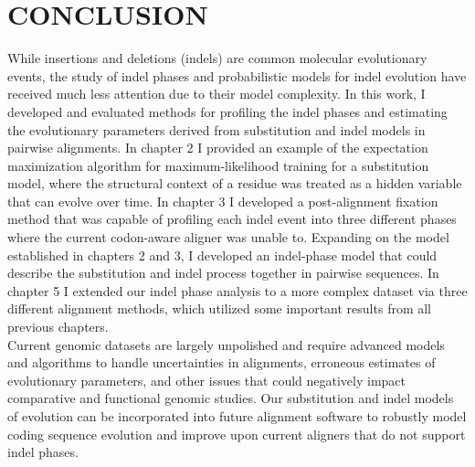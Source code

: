 \chapter{\normalfont CONCLUSION}
While insertions and deletions (indels) are common molecular evolutionary events, the study of indel phases and probabilistic models for indel evolution have received much less attention due to their model complexity. In this work, I developed and evaluated methods for profiling the indel phases and estimating the evolutionary parameters derived from substitution and indel models in pairwise alignments. In chapter 2 I provided an example of the expectation maximization algorithm for maximum-likelihood training for a substitution model, where the structural context of a residue was treated as a hidden variable that can evolve over time. In chapter 3 I developed a post-alignment fixation method that was capable of profiling each indel event into three different phases where the current codon-aware aligner was unable to. Expanding on the model established in chapters 2 and 3, I developed an indel-phase model that could describe the substitution and indel process together in pairwise sequences. In chapter 5 I extended our indel phase analysis to a more complex dataset via three different alignment methods, which utilized some important results from all previous chapters. \\
\indent Current genomic datasets are largely unpolished and require advanced models and algorithms to handle uncertainties in alignments, erroneous estimates of evolutionary parameters, and other issues that could negatively impact comparative and functional genomic studies. Our substitution and indel models of evolution can be incorporated into future alignment software to robustly model coding sequence evolution and improve upon current aligners that do not support indel phases. 
 
